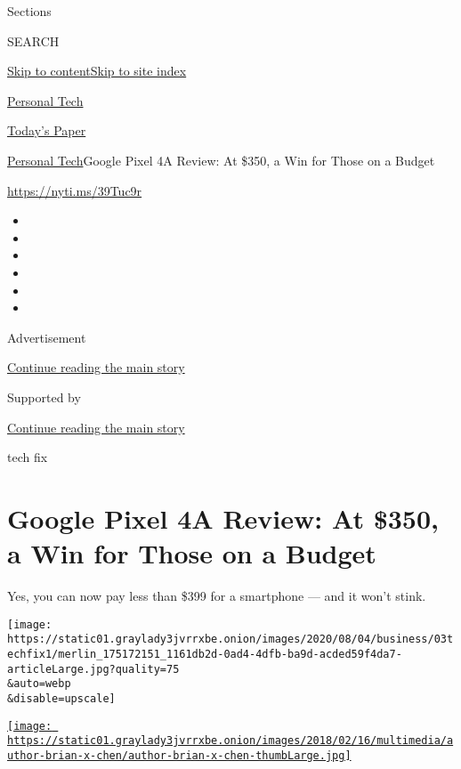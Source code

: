 Sections

SEARCH

\protect\hyperlink{site-content}{Skip to
content}\protect\hyperlink{site-index}{Skip to site index}

\href{https://www.nytimes3xbfgragh.onion/section/technology/personaltech}{Personal
Tech}

\href{https://myaccount.nytimes3xbfgragh.onion/auth/login?response_type=cookie\&client_id=vi}{}

\href{https://www.nytimes3xbfgragh.onion/section/todayspaper}{Today's
Paper}

\href{/section/technology/personaltech}{Personal Tech}\textbar{}Google
Pixel 4A Review: At \$350, a Win for Those on a Budget

\url{https://nyti.ms/39Tuc9r}

\begin{itemize}
\item
\item
\item
\item
\item
\item
\end{itemize}

Advertisement

\protect\hyperlink{after-top}{Continue reading the main story}

Supported by

\protect\hyperlink{after-sponsor}{Continue reading the main story}

tech fix

\hypertarget{google-pixel-4a-review-at-350-a-win-for-those-on-a-budget}{%
\section{Google Pixel 4A Review: At \$350, a Win for Those on a
Budget}\label{google-pixel-4a-review-at-350-a-win-for-those-on-a-budget}}

Yes, you can now pay less than \$399 for a smartphone --- and it won't
stink.

\texttt{[image: https://static01.graylady3jvrrxbe.onion/images/2020/08/04/business/03techfix1/merlin\_175172151\_1161db2d-0ad4-4dfb-ba9d-acded59f4da7-articleLarge.jpg?quality=75\\\&auto=webp\\\&disable=upscale]}

\href{https://www.nytimes3xbfgragh.onion/by/brian-x-chen}{\texttt{[image: https://static01.graylady3jvrrxbe.onion/images/2018/02/16/multimedia/author-brian-x-chen/author-brian-x-chen-thumbLarge.jpg]}}

